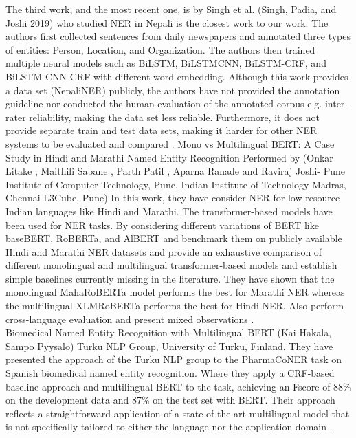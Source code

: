 The third work, and the most recent one, is by Singh et al. (Singh, Padia, and Joshi 2019) who studied NER in Nepali is the closest work to our work. The authors first collected sentences from daily newspapers and annotated three types of entities: Person, Location, and Organization. The authors then trained multiple neural models such as BiLSTM, BiLSTMCNN, BiLSTM-CRF, and BiLSTM-CNN-CRF with different word embedding. Although this work provides a data set (NepaliNER) publicly, the authors have not provided the annotation guideline nor conducted the human evaluation of the annotated corpus e.g. inter-rater reliability, making the data set less reliable. Furthermore, it does not provide separate train and test data sets, making it harder for other NER systems to be evaluated and compared \cite{3}.
\newpage
Mono vs Multilingual BERT: A Case Study in Hindi and Marathi Named Entity Recognition Performed by (Onkar Litake
, Maithili Sabane
, Parth Patil
, Aparna Ranade
and Raviraj Joshi-
Pune Institute of Computer Technology, Pune, Indian Institute of Technology Madras, Chennai
 L3Cube, Pune) 
 In this work, they have consider NER
for low-resource Indian languages like Hindi
and Marathi. The transformer-based models
have been used for NER tasks. By considering different variations of BERT like baseBERT, RoBERTa, and AlBERT and benchmark them on publicly available Hindi and
Marathi NER datasets and provide an exhaustive comparison of different monolingual and
multilingual transformer-based models and establish simple baselines currently missing in
the literature. They have shown that the monolingual
MahaRoBERTa model performs the best for
Marathi NER whereas the multilingual XLMRoBERTa performs the best for Hindi NER.
Also perform cross-language evaluation
and present mixed observations \cite{litake2022mono}.\\

Biomedical Named Entity Recognition with Multilingual BERT 
(Kai Hakala, Sampo Pyysalo)
Turku NLP Group, University of Turku, Finland. 
They have presented the approach of the Turku NLP
group to the PharmaCoNER task on Spanish
biomedical named entity recognition. Where they apply a CRF-based baseline approach and multilingual BERT to the task, achieving an Fscore of 88\% on the development data and
87\% on the test set with BERT. Their approach reflects a straightforward application
of a state-of-the-art multilingual model that is
not specifically tailored to either the language
nor the application domain \cite{hakala-pyysalo-2019-biomedical}.\\

